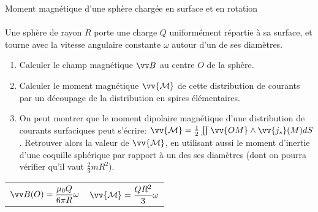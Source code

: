 \documentclass[french, a4paper, 11pt]{article}
\newcommand{\uz}{\vv{u_z}}          %
\begin{document}
\begin{cadre}{Moment magnétique d'une sphère chargée en surface et en rotation}
  \paragraph*{}

  Une sphère de rayon \(R\) porte une charge \(Q\) uniformément répartie à sa surface, et tourne avec la vitesse angulaire constante \(\omega\) autour d'un de ses diamètres.
  \begin{enumerate}[label=\upshape\alph*)]
    \item Calculer le champ magnétique \(\vv B\) au centre \(O\) de la sphère.
    \item Calculer le moment magnétique \(\vv{\mathcal M}\) de cette distribution de courants par un découpage de la distribution en spires élémentaires.
    \item On peut montrer que le moment dipolaire magnétique d'une distribution de courants surfaciques peut s'écrire: \(\vv{\mathcal M} = \frac{1}{2}\iint\vv{OM}\wedge \vv{j_{s}}(M)dS\). Retrouver alors la valeur de \(\vv{\mathcal M}\), en utilisant aussi le moment d'inertie d'une coquille sphérique par rapport à un des ses diamètres (dont on pourra vérifier qu'il vaut \(\frac{2}{3}mR^{2}\)).
  \end{enumerate}
  \tcblower
  \begin{tabularx}{\linewidth}{Xr}
    \(\vv B(O) = \dfrac{\mu_{0}Q}{6\pi R}\omega\) & \(\vv{\mathcal M} = \dfrac{QR^{2}}{3}\omega\)
  \end{tabularx}
\end{cadre}
\end{document}

